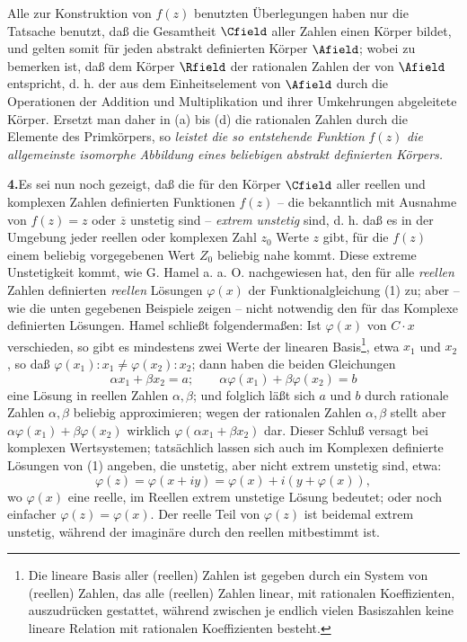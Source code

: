 Alle zur Konstruktion von \(f(z)\) benutzten Überlegungen haben nur die Tatsache benutzt, daß die Gesamtheit \(\Cfield\) aller Zahlen einen Körper bildet, und gelten somit für jeden abstrakt definierten Körper \(\Afield\); wobei zu bemerken ist, daß dem Körper \(\Rfield\) der rationalen Zahlen der  von \(\Afield\) entspricht, d. h. der aus dem Einheitselement von \(\Afield\) durch die Operationen der Addition und Multiplikation und ihrer Umkehrungen abgeleitete Körper. Ersetzt man daher in (a) bis (d) die rationalen Zahlen durch die Elemente des Primkörpers, so \emph{leistet die so entstehende Funktion} \(f(z)\) \emph{die allgemeinste isomorphe Abbildung eines beliebigen abstrakt definierten Körpers.}

\medskip
\noindent\textbf{4.}\quad Es sei nun noch gezeigt, daß die für den Körper \(\Cfield\) aller reellen und komplexen Zahlen definierten Funktionen \(f(z)\) -- die bekanntlich mit Ausnahme von \(f(z)=z\) oder \(\overline z\) unstetig sind -- \emph{extrem unstetig} sind, d. h. daß es in der Umgebung jeder reellen oder komplexen Zahl \(z_0\) Werte \(z\) gibt, für die \(f(z)\) einem beliebig vorgegebenen Wert \(Z_0\) beliebig nahe kommt. Diese extreme Unstetigkeit kommt, wie G. Hamel a. a. O. nachgewiesen hat, den für alle \emph{reellen} Zahlen definierten \emph{reellen} Lösungen \(\varphi(x)\) der Funktionalgleichung (1) zu; aber -- wie die unten gegebenen Beispiele zeigen -- nicht notwendig den für das Komplexe definierten Lösungen. Hamel schließt folgendermaßen: Ist \(\varphi(x)\) von \(C\cdot x\) verschieden, so gibt es mindestens zwei Werte der linearen Basis\footnote{Die lineare Basis aller (reellen) Zahlen ist gegeben durch ein System von (reellen) Zahlen, das alle (reellen) Zahlen linear, mit rationalen Koeffizienten, auszudrücken gestattet, während zwischen je endlich vielen Basiszahlen keine lineare Relation mit rationalen Koeffizienten besteht.}, etwa \(x_1\) und \(x_2\), so daß \(\varphi(x_1):x_1\ne\varphi(x_2):x_2\); dann haben die beiden Gleichungen
\[
\alpha x_1+\beta x_2=a;\qquad \alpha\varphi(x_1)+\beta\varphi(x_2)=b
\]
eine Lösung in reellen Zahlen \(\alpha,\beta\); und folglich läßt sich \(a\) und \(b\) durch rationale Zahlen \(\alpha,\beta\) beliebig approximieren; wegen der rationalen Zahlen \(\alpha,\beta\) stellt aber \(\alpha\varphi(x_1)+\beta\varphi(x_2)\) wirklich \(\varphi(\alpha x_1+\beta x_2)\) dar. Dieser Schluß versagt bei komplexen Wertsystemen; tatsächlich lassen sich auch im Komplexen definierte Lösungen von (1) angeben, die unstetig, aber nicht extrem unstetig sind, etwa:
\[
\varphi(z)=\varphi(x+iy)=\varphi(x)+i(y+\varphi(x)),
\]
wo \(\varphi(x)\) eine reelle, im Reellen extrem unstetige Lösung bedeutet; oder noch einfacher \(\varphi(z)=\varphi(x)\). Der reelle Teil von \(\varphi(z)\) ist beidemal extrem unstetig, während der imaginäre durch den reellen mitbestimmt ist.

